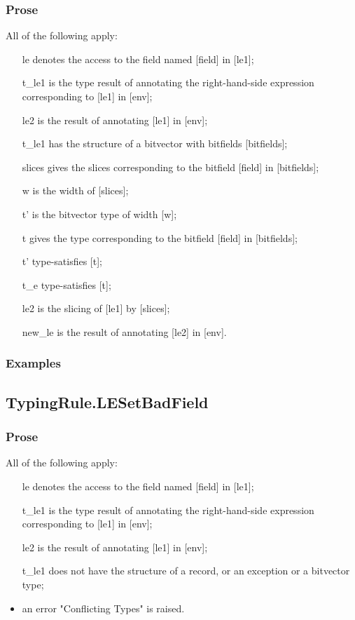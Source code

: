 \documentclass{book}
\begin{document}
    \subsubsection{Prose}
    All of the following apply:
   \begin{itemize}
   \item [le] denotes the access to the field named [field] in [le1];
   \item [t\_le1] is the type result of annotating the right-hand-side expression corresponding to [le1] in [env];
   \item [le2] is the result of annotating [le1] in [env];
   \item [t\_le1] has the structure of a bitvector with bitfields [bitfields];
   \item [slices] gives the slices corresponding to the bitfield [field] in
      [bitfields];
   \item [w] is the width of [slices];
   \item [t'] is the bitvector type of width [w];
   \item [t] gives the type corresponding to the bitfield [field] in
      [bitfields];
   \item [t'] type-satisfies [t];
   \item [t\_e] type-satisfies [t];
   \item [le2] is the slicing of [le1] by [slices];
   \item [new\_le] is the result of annotating [le2] in [env].
   \end{itemize}

    \subsubsection{Examples}

\subsection{TypingRule.LESetBadField}

    \subsubsection{Prose}
    All of the following apply:
   \begin{itemize}
   \item [le] denotes the access to the field named [field] in [le1];
   \item [t\_le1] is the type result of annotating the right-hand-side expression corresponding to [le1] in [env];
   \item [le2] is the result of annotating [le1] in [env];
   \item [t\_le1] does not have the structure of a record, or an exception or a bitvector type;
   \item an error "Conflicting Types" is raised.
   \end{itemize}
\end{document}
